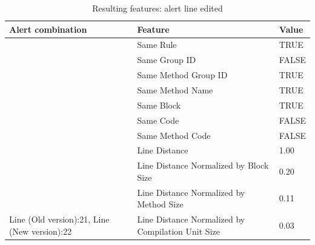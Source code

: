 \documentclass[
]{article}
\begin{document}
\begin{table}[!h]

\caption{\label{tab:unnamed-chunk-15}Resulting features: alert line edited \label{editing_line} }
\centering
\begin{tabular}[t]{l|l|l}
\hline
Alert combination & Feature & Value\\
\hline
\rowcolor{gray!6}   & Same Rule & TRUE\\

 & Same Group ID & FALSE\\

\rowcolor{gray!6}   & Same Method Group ID & TRUE\\

 & Same Method Name & TRUE\\

\rowcolor{gray!6}   & Same Block & TRUE\\

 & Same Code & FALSE\\

\rowcolor{gray!6}   & Same Method Code & FALSE\\

 & Line Distance & 1.00\\

\rowcolor{gray!6}   & Line Distance Normalized by Block Size & 0.20\\

 & Line Distance Normalized by Method Size & 0.11\\

\multirow[t]{-11}{*}{\raggedright\arraybackslash Line (Old version):21, Line (New version):22} & Line Distance Normalized by Compilation Unit Size & 0.03\\
\hline
\end{tabular}
\end{table}

\normalsize

\newpage
\end{document}
